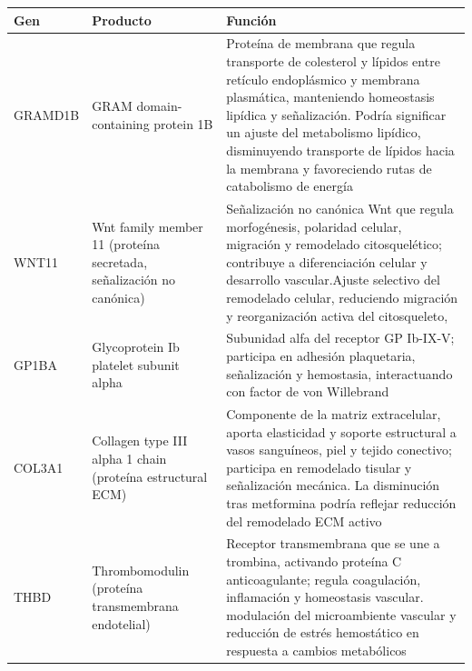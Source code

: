\documentclass[
  spanish,
  11pt,
]{article}
\begin{document}
\begin{longtable}[]{@{}
  >{\raggedright\arraybackslash}p{}
  >{\raggedright\arraybackslash}p{}
  >{\raggedright\arraybackslash}p{}@{}}
\toprule\noalign{}
\begin{minipage}[b]{\linewidth}\raggedright
Gen
\end{minipage} & \begin{minipage}[b]{\linewidth}\raggedright
Producto
\end{minipage} & \begin{minipage}[b]{\linewidth}\raggedright
Función
\end{minipage} \\
\midrule\noalign{}
\endhead
\bottomrule\noalign{}
\endlastfoot
GRAMD1B & GRAM domain-containing protein 1B & Proteína de membrana que
regula transporte de colesterol y lípidos entre retículo endoplásmico y
membrana plasmática, manteniendo homeostasis lipídica y señalización.
Podría significar un ajuste del metabolismo lipídico, disminuyendo
transporte de lípidos hacia la membrana y favoreciendo rutas de
catabolismo de energía \\
WNT11 & Wnt family member 11 (proteína secretada, señalización no
canónica) & Señalización no canónica Wnt que regula morfogénesis,
polaridad celular, migración y remodelado citosquelético; contribuye a
diferenciación celular y desarrollo vascular.Ajuste selectivo del
remodelado celular, reduciendo migración y reorganización activa del
citosqueleto, \\
GP1BA & Glycoprotein Ib platelet subunit alpha & Subunidad alfa del
receptor GP Ib-IX-V; participa en adhesión plaquetaria, señalización y
hemostasia, interactuando con factor de von Willebrand \\
COL3A1 & Collagen type III alpha 1 chain (proteína estructural ECM) &
Componente de la matriz extracelular, aporta elasticidad y soporte
estructural a vasos sanguíneos, piel y tejido conectivo; participa en
remodelado tisular y señalización mecánica. La disminución tras
metformina podría reflejar reducción del remodelado ECM activo \\
THBD & Thrombomodulin (proteína transmembrana endotelial) & Receptor
transmembrana que se une a trombina, activando proteína C
anticoagulante; regula coagulación, inflamación y homeostasis vascular.
modulación del microambiente vascular y reducción de estrés hemostático
en respuesta a cambios metabólicos \\

\end{longtable}
\end{document}
